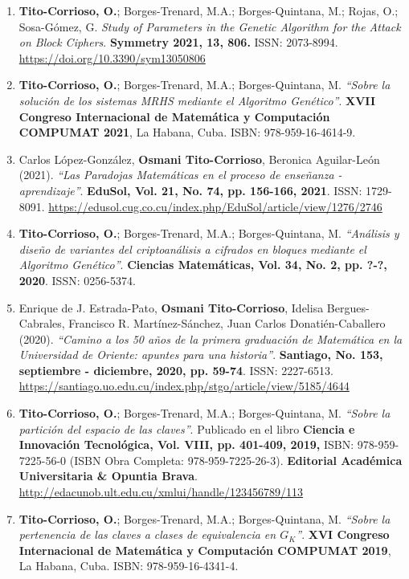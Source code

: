 \begin{enumerate}
   \item \textbf{Tito-Corrioso, O.}; Borges-Trenard, M.A.; Borges-Quintana, M.; Rojas, O.; Sosa-G\'omez, G. \textit{Study of Parameters in the Genetic Algorithm for the Attack on Block Ciphers}. \textbf{Symmetry 2021, 13, 806.} ISSN: 2073-8994. \url{https://doi.org/10.3390/sym13050806}
	\item \textbf{Tito-Corrioso, O.}; Borges-Trenard, M.A.; Borges-Quintana, M. \textit{``Sobre la soluci\'on de los sistemas MRHS mediante el Algoritmo Gen\'etico''}. \textbf{XVII Congreso Internacional de Matem\'atica y Computaci\'on COMPUMAT 2021}, La Habana, Cuba. ISBN: 978-959-16-4614-9.
	 \item Carlos L\'opez-Gonz\'alez, \textbf{Osmani Tito-Corrioso}, Beronica Aguilar-Le\'on (2021). \textit{``Las Paradojas Matem\'aticas en el proceso de ense\~nanza - aprendizaje''}. \textbf{EduSol, Vol. 21, No. 74, pp. 156-166, 2021}. ISSN: 1729-8091. \url{https://edusol.cug.co.cu/index.php/EduSol/article/view/1276/2746}
	 \item \textbf{Tito-Corrioso, O.}; Borges-Trenard, M.A.; Borges-Quintana, M. \textit{``An\'alisis y dise\~no de variantes del criptoan\'alisis a cifrados en bloques mediante el Algoritmo Gen\'etico''}. \textbf{Ciencias Matem\'aticas, Vol. 34, No. 2, pp. ?-?, 2020}. ISSN: 0256-5374.
	\item Enrique de J. Estrada-Pato, \textbf{Osmani Tito-Corrioso}, Idelisa Bergues-Cabrales, Francisco R. Mart\'inez-S\'anchez, Juan Carlos Donati\'en-Caballero (2020). \textit{``Camino a los 50 a\~nos de la primera graduaci\'on de Matem\'atica en la Universidad de Oriente: apuntes para una historia''}. \textbf{Santiago, No. 153, septiembre - diciembre, 2020, pp. 59-74}. ISSN: 2227-6513. \url{https://santiago.uo.edu.cu/index.php/stgo/article/view/5185/4644}
	 \item \textbf{Tito-Corrioso, O.}; Borges-Trenard, M.A.; Borges-Quintana, M. \textit{``Sobre la partici\'on del espacio de las claves''}. Publicado en el libro \textbf{Ciencia e Innovaci\'on Tecnol\'ogica, Vol. VIII, pp. 401-409, 2019,} ISBN: 978-959-7225-56-0 (ISBN Obra Completa: 978-959-7225-26-3). \textbf{Editorial Acad\'emica Universitaria \& Opuntia Brava}. \url{http://edacunob.ult.edu.cu/xmlui/handle/123456789/113}
	\item \textbf{Tito-Corrioso, O.}; Borges-Trenard, M.A.; Borges-Quintana, M. \textit{``Sobre la pertenencia de las claves a clases de equivalencia en $G_{K}$''}. \textbf{XVI Congreso Internacional de Matem\'atica y Computaci\'on COMPUMAT 2019}, La Habana, Cuba. ISBN: 978-959-16-4341-4.

\end{enumerate}
